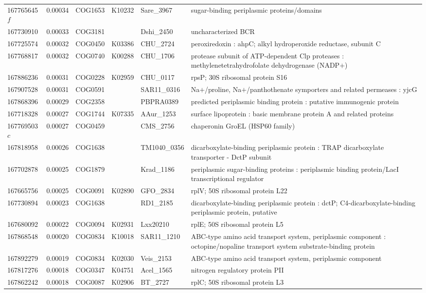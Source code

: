 \begin{landscape}
\begin{longtable}{p{1.8cm}p{0.9cm}p{2.2cm}p{1cm}p{2.8cm}p{13.4cm}}
167765645$f$&0.00034&COG1653&K10232&Sare\_3967&sugar-binding periplasmic proteins/domains \\
167730910&0.00033&COG3181&&Dshi\_2450&uncharacterized BCR \\
167725574&0.00032&COG0450&K03386&CHU\_2724&peroxiredoxin : ahpC; alkyl hydroperoxide reductase, subunit C \\
167768817&0.00032&COG0740&K00288&CHU\_1706&protease subunit of ATP-dependent Clp proteases : methylenetetrahydrofolate dehydrogenase (NADP$+$) \\
167886236&0.00031&COG0228&K02959&CHU\_0117&rpsP; 30S ribosomal protein S16 \\
167907528&0.00031&COG0591&&SAR11\_0316&Na$+$/proline, Na$+$/panthothenate symporters and related permeases : yjcG \\
167868396&0.00029&COG2358&&PBPRA0389&predicted periplasmic binding protein : putative immunogenic protein \\
167718328&0.00027&COG1744&K07335&AAur\_1253&surface lipoprotein : basic membrane protein A and related proteins \\
167769503$c$&0.00027&COG0459&&CMS\_2756&chaperonin GroEL (HSP60 family) \\
167818958&0.00026&COG1638&&TM1040\_0356&dicarboxylate-binding periplasmic protein : TRAP dicarboxylate transporter - DctP subunit \\
167702878&0.00025&COG1879&&Krad\_1186&periplasmic sugar-binding proteins : periplasmic binding protein/LacI transcriptional regulator \\
167665756&0.00025&COG0091&K02890&GFO\_2834&rplV; 50S ribosomal protein L22 \\
167730894&0.00023&COG1638&&RD1\_2185&dicarboxylate-binding periplasmic protein : dctP; C4-dicarboxylate-binding periplasmic protein, putative \\
167680092&0.00022&COG0094&K02931&Lxx20210&rplE; 50S ribosomal protein L5 \\
167868548&0.00020&COG0834&K10018&SAR11\_1210&ABC-type amino acid transport system, periplasmic component : octopine/nopaline transport system substrate-binding protein \\
167892279&0.00019&COG0834&K02030&Veis\_2153&ABC-type amino acid transport system, periplasmic component \\
167817276&0.00018&COG0347&K04751&Acel\_1565&nitrogen regulatory protein PII \\
167862242&0.00018&COG0087&K02906&BT\_2727&rplC; 50S ribosomal protein L3 \\

\end{longtable}
\end{landscape}
